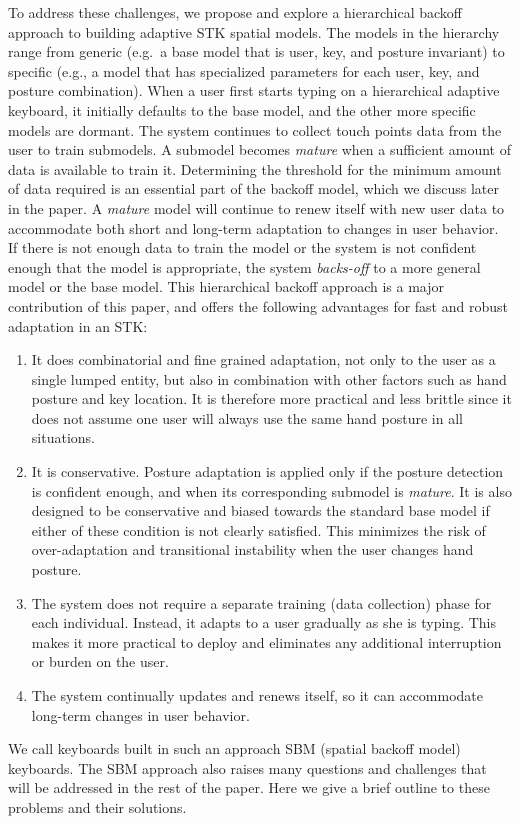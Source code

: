 \documentclass{sigchi}
\begin{document}
To address these challenges, we propose and explore a hierarchical backoff approach to building adaptive STK spatial models. The models in the hierarchy range from generic (e.g.\ a base model that is user, key, and posture invariant) to specific (e.g., a model that has specialized parameters for each user, key, and posture combination). When a user first starts typing on a hierarchical adaptive keyboard, it initially defaults to the base model, and the other more specific models are dormant. The system continues to collect touch points data from the user to train submodels. A submodel becomes \textit{mature} when a sufficient amount of data is available to train it. Determining the threshold for the minimum amount of data required is an essential part of the backoff model, which we discuss later in the paper.
A \textit{mature} model will continue to renew itself with new user data to accommodate  both short and long-term adaptation to changes in user behavior. If there is not enough data to train the model or the system is not confident enough that the model is appropriate, the system \textit{backs-off} to a more general model or the base model. This hierarchical backoff approach is a major contribution of this paper, and offers the following advantages for fast and robust adaptation in an STK:
\begin{enumerate}
\item It does combinatorial and fine grained adaptation, not only to the user as
a single lumped entity, but also in combination with other factors such as hand
posture and key location. It is therefore more practical and less brittle since it does not assume one user will always use the same hand posture in all situations.

\item It is conservative. Posture adaptation is applied only if the posture detection is confident enough, and when its corresponding submodel is \textit{mature}. It is also designed to be conservative and biased towards the standard base model if either of these condition is not clearly satisfied. This minimizes the risk of over-adaptation and transitional instability when the user changes hand posture. 
 
\item The system does not require a separate training (data collection) phase
for each individual. Instead, it adapts to a user gradually as she is typing.
This makes it more practical to deploy and eliminates any additional
interruption or burden on the user.

\item The system continually updates and renews itself, so it can accommodate
long-term changes in user behavior.
\end{enumerate}
We call keyboards built in such an approach SBM (spatial backoff model)
keyboards. The SBM approach also raises many questions and challenges that will
be addressed in the rest of the paper. Here we give a brief outline to these problems and their solutions.
\end{document}
